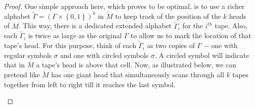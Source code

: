 \documentclass[usletter]{article}
\begin{document}
\begin{itemize}
\begin{proof}
    One simple approach here, which proves to be optimal, is to use a richer alphabet 
    \(\tilde{\Gamma} = (\Gamma \times \left\{ 0,1 \right\})^k\) in \(\tilde{M}\) to keep track
    of the position of the \(k\) heads of \(M\). This way, there is a dedicated extended alphabet
    \(\tilde{\Gamma}_i\) for the \(i^{th}\) tape. Also, each \(\tilde{\Gamma}_i\) is twice as
    large as the original \(\Gamma\) to allow us to mark the location of that tape's head. 
    For this purpose, think of each \(\tilde{\Gamma}_i\) as two copies of \(\Gamma\) \(-\) one with regular symbols \(\sigma\)
    and one with circled symbols \textcircled{\(\sigma\)}. A circled symbol will indicate that in \(M\) a tape's head is above that cell. 
    Now, as illustrated below, we can pretend like \(\tilde{M}\) has one giant head that simultaneously scans through
    all \(k\) tapes together from left to right till it reaches the last symbol.
    
    \begin{figure}[h]
    \centering
\end{figure}
\end{proof}
\end{itemize}
\end{document}
